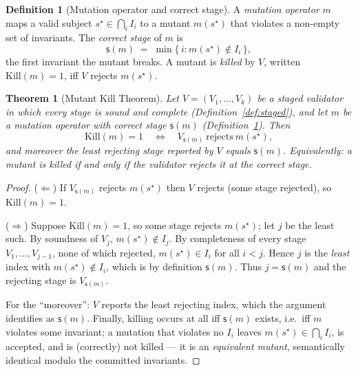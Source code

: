 \documentclass[11pt,oneside]{book}
\theoremstyle{definition}
\newtheorem{definition}{Definition}[chapter]
\theoremstyle{plain}
\newtheorem{theorem}{Theorem}[chapter]
\theoremstyle{remark}
\newcommand{\Kill}{\mathrm{Kill}}
\newcommand{\stg}{\mathsf{s}}                  %
\begin{document}
\begin{definition}[Mutation operator and correct stage]\label{def:mut}
A \emph{mutation operator} $m$ maps a valid subject $s^\star\in\bigcap_i I_i$ to a mutant $m(s^\star)$ that violates a non-empty set of invariants. %
The \emph{correct stage} of $m$ is
\[
\stg(m)\;=\;\min\{\,i : m(s^\star)\notin I_i\,\},
\]
the first invariant the mutant breaks. %
A mutant is \emph{killed} by $V$, written $\Kill(m)=1$, iff $V$ rejects $m(s^\star)$. %
\end{definition}

\begin{theorem}[Mutant Kill Theorem]\label{thm:kill}
Let $V=(V_1,\dots,V_k)$ be a staged validator in which every stage is sound and complete (Definition~\ref{def:staged}), and let $m$ be a mutation operator with correct stage $\stg(m)$ (Definition~\ref{def:mut}). %
Then
\[
\Kill(m)=1\quad\Longleftrightarrow\quad V_{\stg(m)}\ \text{rejects}\ m(s^\star),
\]
and moreover the least rejecting stage reported by $V$ equals $\stg(m)$. %
Equivalently: a mutant is killed if and only if the validator rejects it at the correct stage. %
\end{theorem}

\begin{proof}
($\Leftarrow$) If $V_{\stg(m)}$ rejects $m(s^\star)$ then $V$ rejects (some stage rejected), so $\Kill(m)=1$. %

($\Rightarrow$) Suppose $\Kill(m)=1$, so some stage rejects $m(s^\star)$; let $j$ be the least such. %
By soundness of $V_j$, $m(s^\star)\notin I_j$. %
By completeness of every stage $V_1,\dots,V_{j-1}$, none of which rejected, $m(s^\star)\in I_i$ for all $i<j$. %
Hence $j$ is the \emph{least} index with $m(s^\star)\notin I_i$, which is by definition $\stg(m)$. %
Thus $j=\stg(m)$ and the rejecting stage is $V_{\stg(m)}$. %

For the ``moreover'': $V$ reports the least rejecting index, which the argument identifies as $\stg(m)$. %
Finally, killing occurs at all iff $\stg(m)$ exists, i.e.\ iff $m$ violates some invariant; a mutation that violates no $I_i$ leaves $m(s^\star)\in\bigcap_i I_i$, is accepted, and is (correctly) not killed --- it is an \emph{equivalent mutant}, semantically identical modulo the committed invariants. %
\end{proof}
\end{document}
